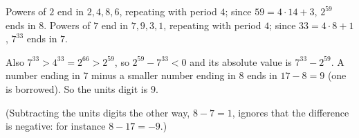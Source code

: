 Powers of $2$ end in $2,4,8,6$, repeating with period $4$; since $59=4\cdot14+3$, $2^{59}$ ends in $8$. Powers of $7$ end in $7,9,3,1$, repeating with period $4$; since $33=4\cdot8+1$, $7^{33}$ ends in $7$.

Also $7^{33}>4^{33}=2^{66}>2^{59}$, so $2^{59}-7^{33}<0$ and its absolute value is $7^{33}-2^{59}$. A number ending in $7$ minus a smaller number ending in $8$ ends in $17-8=9$ (one is borrowed). So the units digit is $\boxed{9}$.

(Subtracting the units digits the other way, $8-7=1$, ignores that the difference is negative: for instance $8-17=-9$.)
